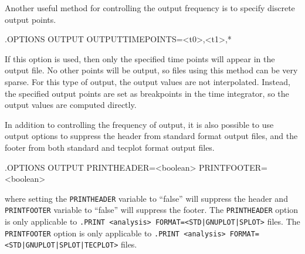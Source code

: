 Another useful method for controlling the output frequency is to specify discrete output
points.  
\begin{vquote}
.OPTIONS OUTPUT OUTPUTTIMEPOINTS=<t0>,<t1>,* 
\end{vquote}
If this option is used, then only the specified time points will appear in the output file.
No other points will be output, so files using this method can be very sparse.  For this type
of output, the output values are not interpolated.  Instead, the specified output points are 
set as breakpoints in the time integrator, so the output values are computed directly.

In addition to controlling the frequency of output, it is also possible to use
output options to suppress the header from standard format output files, and the footer
from both standard and tecplot format output files.
\begin{vquote}
.OPTIONS OUTPUT PRINTHEADER=<boolean> PRINTFOOTER=<boolean>
\end{vquote}
where setting the \texttt{PRINTHEADER} variable to ``false'' will suppress the header and 
\texttt{PRINTFOOTER} variable to ``false'' will suppress the footer.  The \texttt{PRINTHEADER}
option is only applicable to \texttt{.PRINT <analysis> FORMAT=<STD|GNUPLOT|SPLOT>} files.
The \texttt{PRINTFOOTER} option is only applicable to
\texttt{.PRINT <analysis> FORMAT=<STD|GNUPLOT|SPLOT|TECPLOT>} files.

